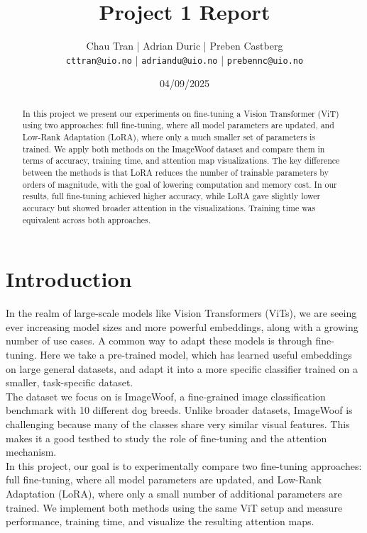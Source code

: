 \documentclass[10pt]{article}
\begin{document}
\title{Project 1 Report}
\author{Chau Tran | Adrian Duric | Preben Castberg\\\footnotesize\texttt{cttran@uio.no} | \texttt{adriandu@uio.no} | \texttt{prebennc@uio.no}}
\date{04/09/2025}
\maketitle

\begin{abstract}
In this project we present our experiments on fine-tuning a Vision Transformer (ViT) using two approaches: full fine-tuning, where all model parameters are updated, and Low-Rank Adaptation (LoRA), where only a much smaller set of parameters is trained. We apply both methods on the ImageWoof dataset and compare them in terms of accuracy, training time, and attention map visualizations. The key difference between the methods is that LoRA reduces the number of trainable parameters by orders of magnitude, with the goal of lowering computation and memory cost. In our results, full fine-tuning achieved higher accuracy, while LoRA gave slightly lower accuracy but showed broader attention in the visualizations. Training time was equivalent across both approaches.
\end{abstract}

\section{Introduction}
In the realm of large-scale models like Vision Transformers (ViTs), we are seeing ever increasing model sizes and more powerful embeddings, along with a growing number of use cases. A common way to adapt these models is through fine-tuning. Here we take a pre-trained model, which has learned useful embeddings on large general datasets, and adapt it into a more specific classifier trained on a smaller, task-specific dataset. \\ 

The dataset we focus on is ImageWoof, a fine-grained image classification benchmark with 10 different dog breeds. Unlike broader datasets, ImageWoof is challenging because many of the classes share very similar visual features. This makes it a good testbed to study the role of fine-tuning and the attention mechanism.\\ 

In this project, our goal is to experimentally compare two fine-tuning approaches: full fine-tuning, where all model parameters are updated, and Low-Rank Adaptation (LoRA), where only a small number of additional parameters are trained. We implement both methods using the same ViT setup and measure performance, training time, and visualize the resulting attention maps.\\ 
\end{document}
